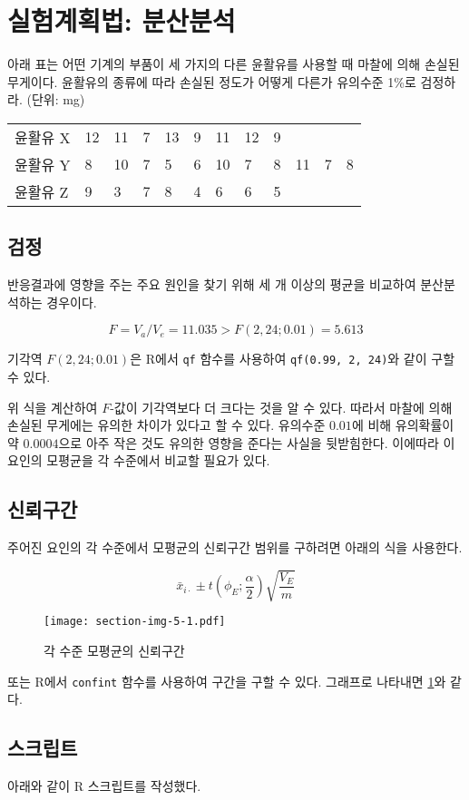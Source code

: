 \section{실험계획법: 분산분석}
아래 표는 어떤 기계의 부품이 세 가지의 다른 윤활유를 사용할 때 마찰에
의해 손실된 무게이다. 윤활유의 종류에 따라 손실된 정도가 어떻게 다른가
유의수준 1\%로 검정하라. {\small(단위: mg)}

\begin{tabularx}{0.9\textwidth}{ l|XXXXXXXXXXX }
  \noalign{\smallskip}\hline\noalign{\smallskip}
  윤활유 X & 12 & 11 & 7 & 13 & 9 & 11 & 12 & 9 \\
  윤활유 Y & 8 & 10 & 7 & 5 & 6 & 10 & 7 & 8 & 11 & 7 & 8\\
  윤활유 Z & 9 & 3 & 7 & 8 & 4 & 6 & 6 & 5
\end{tabularx}

\subsection{검정}

반응결과에 영향을 주는 주요 원인을 찾기 위해 세 개 이상의 평균을 비교하여
분산분석하는 경우이다.


\[
F = V_a / V_e = 11.035 > F(2, 24; 0.01) = 5.613
\]

기각역 $F(2, 24; 0.01)$은 R에서 \texttt{qf} 함수를 사용하여
\texttt{qf(0.99, 2, 24)}와 같이 구할 수 있다.

위 식을 계산하여 $F$-값이 기각역보다 더 크다는 것을 알 수 있다.
따라서 마찰에 의해 손실된 무게에는 유의한 차이가 있다고 할 수 있다.
유의수준 $0.01$에 비해 유의확률이 약 $0.0004$으로 아주 작은 것도 유의한 영향을 준다는 사실을 뒷받힘한다.
이에따라 이 요인의 모평균을 각 수준에서 비교할 필요가 있다.

\subsection{신뢰구간}

주어진 요인의 각 수준에서 모평균의 신뢰구간 범위를 구하려면 아래의 식을 사용한다.

\[
 \bar{x}_{i\cdot} \pm t\left(\phi_E; \frac{\alpha}{2}\right) \sqrt{\frac{V_E}{m}}
\]



\begin{figure}[!hb]
  \centering
  \texttt{[image: section-img-5-1.pdf]}
  \caption{각 수준 모평균의 신뢰구간}
  \label{ci}
\end{figure}

또는 R에서 \texttt{confint} 함수를 사용하여 구간을 구할 수 있다.
그래프로 나타내면 \ref{ci}와 같다.

\subsection{스크립트}
아래와 같이 R 스크립트를 작성했다.





